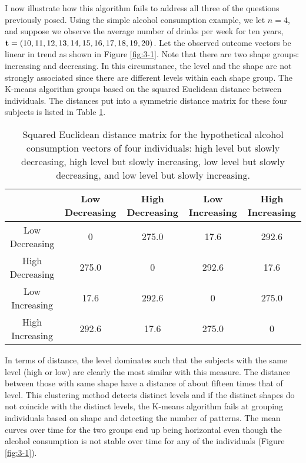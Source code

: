 I now illustrate how this algorithm fails to address all three of the questions previously posed. Using the simple alcohol consumption example, we let $n=4$, and suppose we observe the average number of drinks per week for ten years, $\mathbf t=(10,11,12,13,14,15,16,17,18,19,20)$. Let the observed outcome vectors be linear in trend as shown in Figure \ref{fig:3-1}. Note that there are two shape groups: increasing and decreasing. In this circumstance, the level and the shape are not strongly associated since there are different levels within each shape group. The K-means algorithm groups based on the squared Euclidean distance between individuals. The distances put into a symmetric distance matrix for these four subjects is listed in Table \ref{tab:3-1}. 
\begin{table}[h]
\begin{center}
\begin{tabular}{c|cccc}
&Low Decreasing& High Decreasing&Low Increasing&High Increasing\\
\hline
Low Decreasing&0&275.0&17.6&292.6\\
High Decreasing&275.0  &0 &  292.6 &17.6 \\                     
Low Increasing& 17.6 &292.6  &0   &275.0   \\          
High Increasing& 292.6 &17.6 &275.0   &0 
\end{tabular}
\end{center}
\caption{Squared Euclidean distance matrix for the hypothetical alcohol consumption vectors of four individuals: high level but slowly decreasing, high level but slowly increasing, low level but slowly decreasing, and low level but slowly increasing. }
\label{tab:3-1}
\end{table}

In terms of distance, the level dominates such that the subjects with the same level (high or low) are clearly the most similar with this measure. The distance between those with same shape have a distance of about fifteen times that of level. This clustering method detects distinct levels and if the distinct shapes do not coincide with the distinct levels, the K-means algorithm fails at grouping individuals based on shape and detecting the number of patterns. The mean curves over time for the two groups end up being horizontal even though the alcohol consumption is not stable over time for any of the individuals (Figure \ref{fig:3-1}).

